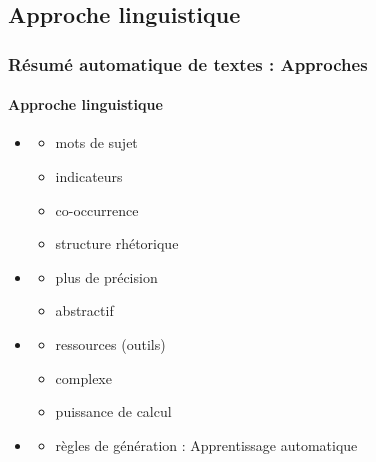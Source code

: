 \documentclass[xcolor=table]{beamer}
\begin{document}
\subsection{Approche linguistique} 

\begin{frame}
\frametitle{Résumé automatique de textes : Approches}
\framesubtitle{Approche linguistique}
	
\begin{itemize}
	\item {}
	\vspace{-.5cm}
	\begin{multicols}{3}
		\begin{itemize}
			\item mots de sujet
			\item indicateurs
			\item co-occurrence
			\item structure rhétorique
		\end{itemize}
	\end{multicols}
	
	\item {}
	\vspace{-.5cm}
	\begin{multicols}{3}
		\begin{itemize}
			\item plus de précision
			\item abstractif
		\end{itemize}
	\end{multicols}
	
	\item {}
	\vspace{-.5cm}
	\begin{multicols}{3}
		\begin{itemize}
			\item ressources (outils)
			\item complexe
			\item puissance de calcul
		\end{itemize}
	\end{multicols}
	
	\item {}
	\begin{itemize}
		\item règles de génération : Apprentissage automatique
	\end{itemize}
	
\end{itemize}

\end{frame}
\end{document}
